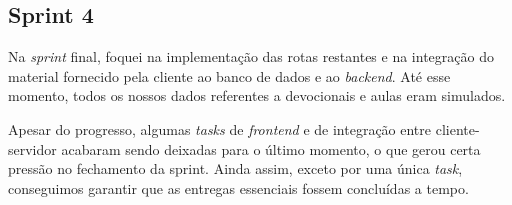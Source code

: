 \subsection{Sprint 4}

Na \textit{sprint} final, foquei na implementação das rotas restantes e na integração do material fornecido pela cliente ao banco de dados e ao \textit{backend}. Até esse momento, todos os nossos dados referentes a devocionais e aulas eram simulados.

Apesar do progresso, algumas \textit{tasks} de \textit{frontend} e de integração entre cliente-servidor acabaram sendo deixadas para o último momento, o que gerou certa pressão no fechamento da sprint. Ainda assim, exceto por uma única \textit{task}, conseguimos garantir que as entregas essenciais fossem concluídas a tempo.
\\
\\
\noindent{}